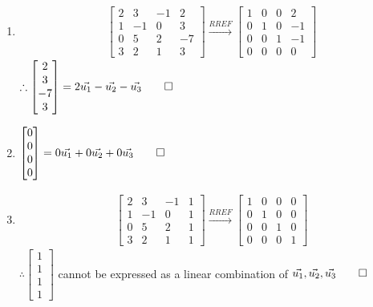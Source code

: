 \documentclass[12pt, a4paper]{article}
\begin{document}
\begin{enumerate}[Q\arabic*.]
\begin{enumerate}[(\alph*)]
\begin{enumerate}[(\roman*)]
          \item 
          \begin{align*}
            \begin{bmatrix}
              2 & 3 & -1 & 2\\
              1 & -1 & 0 & 3\\
              0 & 5 & 2 & -7\\
              3 & 2 & 1 & 3
            \end{bmatrix}\xrightarrow{RREF}
            \begin{bmatrix}
              1 & 0 & 0 & 2\\
              0 & 1 & 0 & -1\\
              0 & 0 & 1 & -1\\
              0 & 0 & 0 & 0
            \end{bmatrix}
          \end{align*}
          $\therefore \begin{bmatrix}2\\3\\-7\\3\end{bmatrix} = 2\vec{u_1} - \vec{u_2} - \vec{u_3} \qed$

          \item 
          $\begin{bmatrix}0\\0\\0\\0\end{bmatrix} = 0\vec{u_1} + 0\vec{u_2} + 0\vec{u_3} \qed$

        \item \begin{align*}
            \begin{bmatrix}
              2 & 3 & -1 & 1\\
              1 & -1 & 0 & 1\\
              0 & 5 & 2 & 1\\
              3 & 2 & 1 & 1
            \end{bmatrix}\xrightarrow{RREF}
            \begin{bmatrix}
              1 & 0 & 0 & 0\\
              0 & 1 & 0 & 0\\
              0 & 0 & 1 & 0\\
              0 & 0 & 0 & 1
            \end{bmatrix}
          \end{align*}
          $\therefore \begin{bmatrix}1\\1\\1\\1\end{bmatrix}$ cannot be expressed as a linear combination of $\vec{u_1}, \vec{u_2}, \vec{u_3} \qed$
          

\end{enumerate}
\end{enumerate}
\end{enumerate}
\end{document}
